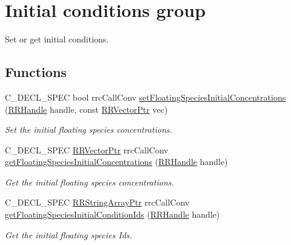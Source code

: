 \hypertarget{group__initial_conditions}{}\section{Initial conditions group}
\label{group__initial_conditions}


Set or get initial conditions.  


\subsection*{Functions}
\begin{DoxyCompactItemize}
\item 
C\+\_\+\+D\+E\+C\+L\+\_\+\+S\+P\+E\+C bool rrc\+Call\+Conv \hyperlink{group__initial_conditions_ga669ae93bd60148aaf48f7105748a551e}{set\+Floating\+Species\+Initial\+Concentrations} (\hyperlink{rrc__types_8h_a1d68f0592372208fa5a5f2799ea4b3ae}{R\+R\+Handle} handle, const \hyperlink{rrc__types_8h_a3be72d6006034fd349f753d2bf441bf7}{R\+R\+Vector\+Ptr} vec)
\begin{DoxyCompactList}\small\item\em Set the initial floating species concentrations. \end{DoxyCompactList}\item 
C\+\_\+\+D\+E\+C\+L\+\_\+\+S\+P\+E\+C \hyperlink{rrc__types_8h_a3be72d6006034fd349f753d2bf441bf7}{R\+R\+Vector\+Ptr} rrc\+Call\+Conv \hyperlink{group__initial_conditions_ga69c0a516f028a0608d8b9167ff56111f}{get\+Floating\+Species\+Initial\+Concentrations} (\hyperlink{rrc__types_8h_a1d68f0592372208fa5a5f2799ea4b3ae}{R\+R\+Handle} handle)
\begin{DoxyCompactList}\small\item\em Get the initial floating species concentrations. \end{DoxyCompactList}\item 
C\+\_\+\+D\+E\+C\+L\+\_\+\+S\+P\+E\+C \hyperlink{rrc__types_8h_a7c9475df6c7337d99482b13a365e7596}{R\+R\+String\+Array\+Ptr} rrc\+Call\+Conv \hyperlink{group__initial_conditions_ga1e19db0cfd663b9648f59191afdc64c6}{get\+Floating\+Species\+Initial\+Condition\+Ids} (\hyperlink{rrc__types_8h_a1d68f0592372208fa5a5f2799ea4b3ae}{R\+R\+Handle} handle)
\begin{DoxyCompactList}\small\item\em Get the initial floating species Ids. \end{DoxyCompactList}\end{DoxyCompactItemize}


